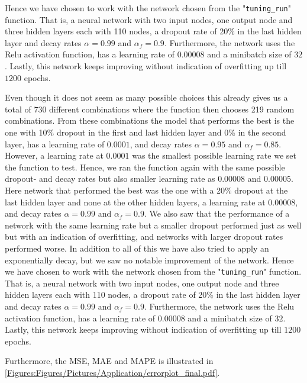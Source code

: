 Hence we have chosen to work with the network chosen from the "\lstinline{tuning_run}" function. That is, a neural network with two input nodes, one output node and three hidden layers each with 110 nodes, a dropout rate of 20\% in the last hidden layer and decay rates $\alpha = 0.99$ and $\alpha_f = 0.9$. Furthermore, the network uses the Relu activation function, has a learning rate of $0.00008$ and a minibatch size of $32$. Lastly, this network keeps improving without indication of overfitting up till $1200$ epochs.


Even though it does not seem as many possible choices this already gives us a total of 730 different combinations where the function then chooses 219 random combinations. From these combinations the model that performs the best is the one with 10\% dropout in the first and last hidden layer and 0\% in the second layer, has a learning rate of $0.0001$, and decay rates $\alpha = 0.95$ and $\alpha_f = 0.85$. However, a learning rate at $0.0001$ was the smallest possible learning rate we set the function to test. Hence, we ran the function again with the same possible dropout- and decay rates but also smaller learning rate as $0.00008$ and $0.00005$. Here network that performed the best was the one with a 20\% dropout at the last hidden layer and none at the other hidden layers, a learning rate at $0.00008$, and decay rates $\alpha = 0.99$ and $\alpha_f = 0.9$. We also saw that the performance of a network with the same learning rate but a smaller dropout performed just as well but with an indication of overfitting, and networks with larger dropout rates performed worse. In addition to all of this we have also tried to apply an exponentially decay, but we saw no notable improvement of the network. Hence we have chosen to work with the network chosen from the "\lstinline{tuning_run}" function. That is, a neural network with two input nodes, one output node and three hidden layers each with 110 nodes, a dropout rate of 20\% in the last hidden layer and decay rates $\alpha = 0.99$ and $\alpha_f = 0.9$. Furthermore, the network uses the Relu activation function, has a learning rate of $0.00008$ and a minibatch size of $32$. Lastly, this network keeps improving without indication of overfitting up till $1200$ epochs.

Furthermore, the MSE, MAE and MAPE is illustrated in \autoref{Figures:Figures/Pictures/Application/errorplot_final.pdf}.

